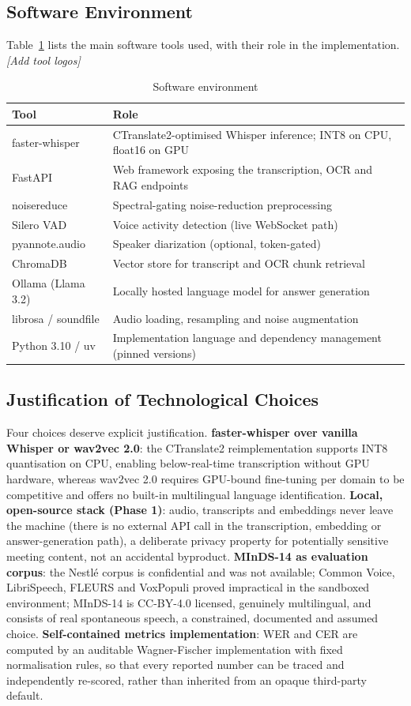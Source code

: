 \documentclass[12pt]{report}
\newcommand{\todo}[1]{\textsl{\colorbox[rgb]{1,1,0}{#1}}}
\begin{document}
\subsection{Software Environment}
Table~\ref{tab:software} lists the main software tools used, with their role in the implementation. \todo{[Add tool logos]}
\begin{table}[H]
\centering
\small
\begin{tabular}{|l|p{9.5cm}|}
\hline
\textbf{Tool} & \textbf{Role} \\ \hline
faster-whisper & CTranslate2-optimised Whisper inference; INT8 on CPU, float16 on GPU \\ \hline
FastAPI & Web framework exposing the transcription, OCR and RAG endpoints \\ \hline
noisereduce & Spectral-gating noise-reduction preprocessing \\ \hline
Silero VAD & Voice activity detection (live WebSocket path) \\ \hline
pyannote.audio & Speaker diarization (optional, token-gated) \\ \hline
ChromaDB & Vector store for transcript and OCR chunk retrieval \\ \hline
Ollama (Llama 3.2) & Locally hosted language model for answer generation \\ \hline
librosa / soundfile & Audio loading, resampling and noise augmentation \\ \hline
Python 3.10 / uv & Implementation language and dependency management (pinned versions) \\ \hline
\end{tabular}
\caption{Software environment}
\label{tab:software}
\end{table}
\subsection{Justification of Technological Choices}
Four choices deserve explicit justification. \textbf{faster-whisper over vanilla Whisper or wav2vec 2.0}: the CTranslate2 reimplementation supports INT8 quantisation on CPU, enabling below-real-time transcription without GPU hardware, whereas wav2vec 2.0 requires GPU-bound fine-tuning per domain to be competitive and offers no built-in multilingual language identification. \textbf{Local, open-source stack (Phase 1)}: audio, transcripts and embeddings never leave the machine (there is no external API call in the transcription, embedding or answer-generation path), a deliberate privacy property for potentially sensitive meeting content, not an accidental byproduct. \textbf{MInDS-14 as evaluation corpus}: the Nestl\'e corpus is confidential and was not available; Common Voice, LibriSpeech, FLEURS and VoxPopuli proved impractical in the sandboxed environment; MInDS-14 is CC-BY-4.0 licensed, genuinely multilingual, and consists of real spontaneous speech, a constrained, documented and assumed choice. \textbf{Self-contained metrics implementation}: WER and CER are computed by an auditable Wagner-Fischer implementation with fixed normalisation rules, so that every reported number can be traced and independently re-scored, rather than inherited from an opaque third-party default.
\end{document}
